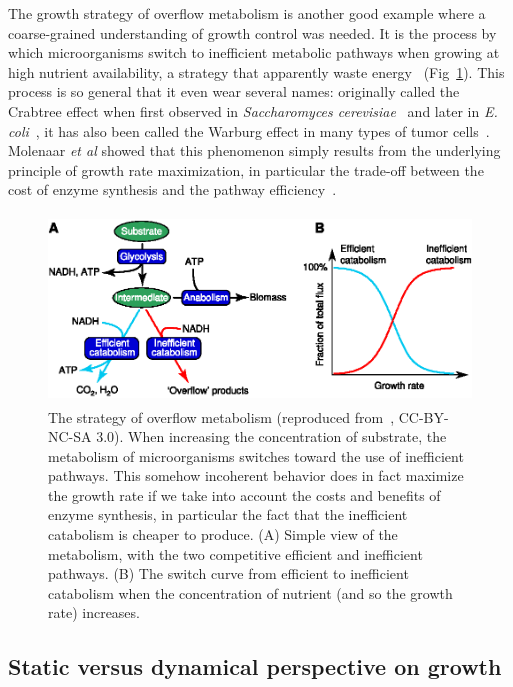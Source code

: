 The growth strategy of overflow metabolism is another good example where a coarse-grained understanding of growth control was needed.
It is the process by which microorganisms switch to inefficient metabolic pathways when growing at high nutrient availability, a strategy that apparently waste energy~\cite{molenaar_shifts_2009} (Fig~\ref{fig:molenaar_overflow}).
This process is so general that it even wear several names: originally called the Crabtree effect when first observed in \textit{Saccharomyces cerevisiae}~\cite{dijken_kinetics_1993} and later in \textit{E. coli}~\cite{vemuri_overflow_2006}, it has also been called the Warburg effect in many types of tumor cells~\cite{mckeehan_glycolysis_1982,hsu_cancer_2008}.
Molenaar \textit{et al} showed that this phenomenon simply results from the underlying principle of growth rate maximization, in particular the trade-off between the cost of enzyme synthesis and the pathway efficiency~\cite{molenaar_shifts_2009}.

\begin{figure}[!h]
\centering
\includegraphics[height=5cm]{./Fig/Chapter1/molenaar_overflow.eps}
\caption{The strategy of overflow metabolism (reproduced from~\cite{molenaar_shifts_2009}, CC-BY-NC-SA 3.0).
When increasing the concentration of substrate, the metabolism of microorganisms switches toward the use of inefficient pathways.
This somehow incoherent behavior does in fact maximize the growth rate if we take into account the costs and benefits of enzyme synthesis, in particular the fact that the inefficient catabolism is cheaper to produce.
(A) Simple view of the metabolism, with the two competitive efficient and inefficient pathways.
(B) The switch curve from efficient to inefficient catabolism when the concentration of nutrient (and so the growth rate) increases.
}
\label{fig:molenaar_overflow}
\end{figure}

\subsection{Static versus dynamical perspective on growth}

